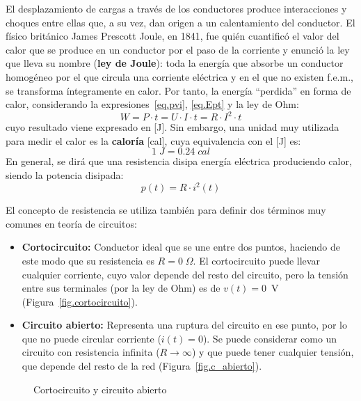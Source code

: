 \documentclass[11pt]{book} %
\begin{document}
	El desplazamiento de cargas a través de los conductores produce interacciones y choques entre ellas que, a su vez, dan
	origen a un calentamiento del conductor. El físico británico James Prescott Joule, en 1841, fue quién cuantificó el valor del calor que se produce en un conductor por el paso de la corriente y enunció la ley que lleva su nombre (\textbf{ley de Joule}): toda la energía que absorbe un conductor homogéneo por el que circula una corriente eléctrica y en el que no existen f.e.m., se transforma íntegramente en calor. Por tanto, la energía ``perdida'' en forma de calor, considerando la expresiones~\eqref{eq.pvi}, \eqref{eq.Ept} y la ley de Ohm:
	\begin{equation*}
		W=P\cdot t=U\cdot I\cdot t=R\cdot I^2\cdot t
	\end{equation*}
	cuyo resultado viene expresado en [J]. Sin embargo, una unidad muy utilizada para medir el calor es la \textbf{caloría} [cal], cuya equivalencia con el [J] es:
	\begin{equation*}
		1\;J=0.24\;cal
	\end{equation*}
	En general, se dirá que una resistencia disipa energía eléctrica produciendo calor, siendo la potencia disipada: 
	\begin{equation*}
		p(t)=R\cdot i^{2}(t)
	\end{equation*}
	
	El concepto de resistencia se utiliza también para definir dos términos muy comunes en teoría de circuitos:
	\begin{itemize}
		\item \textbf{Cortocircuito:} Conductor ideal que se une entre dos puntos, haciendo de este modo que su resistencia es $R=0\;\Omega$. El cortocircuito puede llevar cualquier corriente, cuyo valor depende del resto del circuito, pero la tensión entre sus terminales (por la ley de Ohm) es de $v(t)=0$~V (Figura~\ref{fig.cortocircuito}). 
		\item \textbf{Circuito abierto:} Representa una ruptura del circuito en ese punto, por lo que no puede circular corriente ($i(t)=0$). Se puede considerar como un circuito con resistencia infinita ($R\rightarrow\infty$) y que puede tener cualquier tensión, que depende del resto de la red (Figura~\ref{fig.c_abierto}).
	\end{itemize}
	\begin{figure}[htbp]
		\centering
		\hfil
		\caption{Cortocircuito y circuito abierto}
		
	\end{figure}
	
\end{document}
